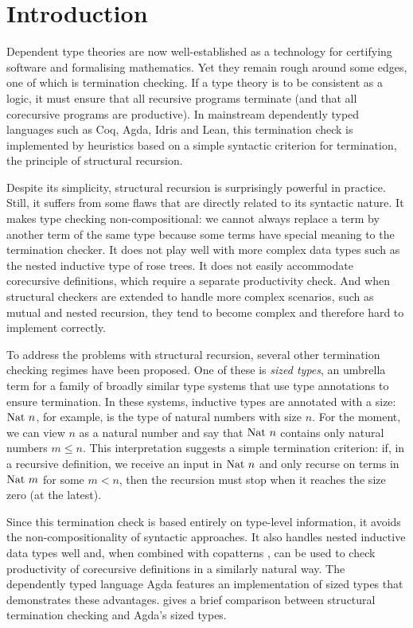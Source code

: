\chapter{Introduction}

Dependent type theories are now well-established as a technology for certifying
software and formalising mathematics. Yet they remain rough around some edges,
one of which is termination checking. If a type theory is to be consistent as a
logic, it must ensure that all recursive programs terminate (and that all
corecursive programs are productive). In mainstream dependently typed languages
such as Coq, Agda, Idris and Lean, this termination check is implemented by
heuristics based on a simple syntactic criterion for termination, the principle
of structural recursion.

Despite its simplicity, structural recursion is surprisingly powerful in
practice. Still, it suffers from some flaws that are directly related to its
syntactic nature. It makes type checking non-compositional: we cannot always
replace a term by another term of the same type because some terms have special
meaning to the termination checker. It does not play well with more complex data
types such as the nested inductive type of rose trees. It does not easily
accommodate corecursive definitions, which require a separate productivity
check. And when structural checkers are extended to handle more complex
scenarios, such as mutual and nested recursion, they tend to become complex and
therefore hard to implement correctly.

To address the problems with structural recursion, several other termination
checking regimes have been proposed. One of these is \emph{sized types}, an
umbrella term for a family of broadly similar type systems that use type
annotations to ensure termination. In these systems, inductive types are
annotated with a size: $\mathrm{Nat}~n$, for example, is the type of natural numbers
with size $n$. For the moment, we can view $n$ as a natural number and say that
$\mathrm{Nat}~n$ contains only natural numbers $m ≤ n$. This interpretation suggests a
simple termination criterion: if, in a recursive definition, we receive an input
in $\mathrm{Nat}~n$ and only recurse on terms in $\mathrm{Nat}~m$ for some $m < n$, then the
recursion must stop when it reaches the size zero (at the latest).

Since this termination check is based entirely on type-level information, it
avoids the non-compositionality of syntactic approaches. It also handles nested
inductive data types well and, when combined with copatterns \cite{abel2016},
can be used to check productivity of corecursive definitions in a similarly
natural way. The dependently typed language Agda features an implementation of
sized types that demonstrates these advantages.  gives a
brief comparison between structural termination checking and Agda's sized types.

